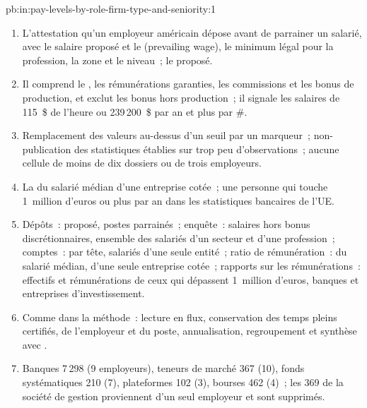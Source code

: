 \begin{solution}{pb:in:pay-levels-by-role-firm-type-and-seniority:1}
\begin{enumerate}
\item L'attestation qu'un employeur américain dépose avant de parrainer un salarié, avec le salaire proposé et le  (prevailing wage), le
minimum légal pour la profession, la zone et le niveau~; le  proposé.
\item Il comprend le , les rémunérations garanties, les commissions et les bonus de production, et exclut les bonus hors production~; il signale
les salaires de 115~\$ de l'heure ou 239\,200~\$ par an et plus par \#.
\item Remplacement des valeurs au-dessus d'un seuil par un marqueur~; non-publication des statistiques établies sur trop peu d'observations~; aucune cellule de moins de
dix dossiers ou de trois employeurs.
\item La  du salarié médian d'une entreprise cotée~; une personne qui touche 1~million d'euros ou plus par an dans les
statistiques bancaires de l'UE.
\item Dépôts~:  proposé, postes parrainés~; enquête~: salaires hors bonus discrétionnaires, ensemble des salariés d'un
secteur et d'une profession~; comptes~:  par tête, salariés d'une seule entité~; ratio de rémunération~:  du salarié médian,
d'une seule entreprise cotée~; rapports sur les rémunérations~: effectifs et rémunérations de ceux qui dépassent 1~million d'euros, banques et entreprises d'investissement.
\item Comme dans la méthode~: lecture en flux, conservation des temps pleins certifiés,  de l'employeur et du poste, annualisation, regroupement et synthèse avec
.
\item Banques 7\,298 (9 employeurs), teneurs de marché 367 (10), fonds systématiques 210 (7), plateformes 102 (3), bourses 462
(4)~; les 369 de la société de gestion proviennent d'un seul employeur et sont supprimés.

\end{enumerate}
\end{solution}
